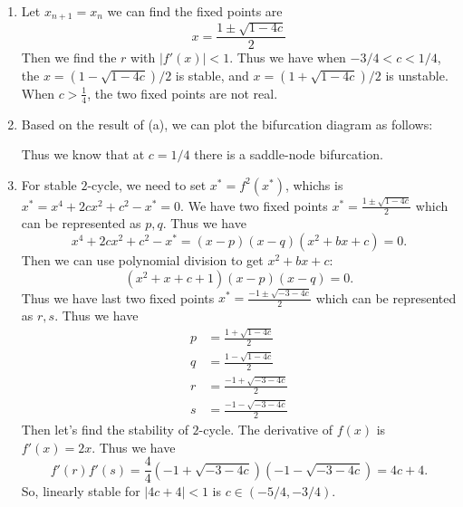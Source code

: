 \documentclass[12pt]{exam}
\begin{document}
\begin{enumerate}
	\item Let $x_{n+1} = x_n$ we can find the fixed points are 
	\[ x = \frac{1 \pm \sqrt{1-4c}}{2} \]
	Then we find the $r$ with $|f'(x)| < 1$. Thus we have when $-3/4 < c<1/4$, the $x = (1-\sqrt{1-4c})/2$ is stable, and $x = (1+\sqrt{1-4c})/2$ is unstable. When $c > \frac{1}{4}$, the two fixed points are not real.	

	\item Based on the result of (a), we can plot the bifurcation diagram as follows:


		Thus we know that at $c=1/4$ there is a saddle-node bifurcation.

	\item For stable $2$-cycle, we need to set $x^* = f^2(x^*)$, whichs is $x^* = x^4 + 2cx^2 + c^2 - x^* = 0$. We have two fixed points $x^* = \frac{1 \pm \sqrt{1-4c}}{2}$ which can be represented as $p,q$. Thus we have
		\[ x^4 + 2cx^2 + c^2 - x^* = (x-p)(x-q)(x^2+bx+c) = 0 .\]
		Then we can use polynomial division to get $x^2+bx+c$:
		\[ (x^2 + x+ c+1)(x-p)(x-q) = 0 .\]
		Thus we have last two fixed points $x^* = \frac{-1 \pm \sqrt{-3-4c}}{2}$ which can be represented as $r,s$. Thus we have
		\begin{align}
			p &= \frac{1 + \sqrt{1-4c}}{2} \\
			q &= \frac{1 - \sqrt{1-4c}}{2} \\
			r &= \frac{-1 + \sqrt{-3-4c}}{2} \\
			s &= \frac{-1 - \sqrt{-3-4c}}{2} 
		\end{align}
		Then let's find the stability of $2$-cycle. The derivative of $f(x)$ is $f'(x) = 2x$. Thus we have
		\[ f'(r)f'(s) = \frac{4}{4}(-1 + \sqrt{-3-4c})(-1 - \sqrt{-3-4c}) = 4c+4 .\]
		So, linearly stable for $|4c+4| < 1$ is $c \in (-5/4, -3/4)$.
		

\end{enumerate}
\end{document}
